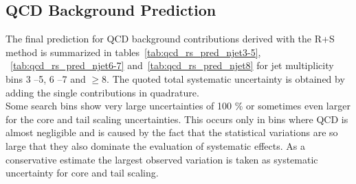 \subsection{QCD Background Prediction}
\label{subsec:RA2_qcd_pred}
The final prediction for QCD background contributions derived with the R+S method is summarized in tables~\ref{tab:qcd_rs_pred_njet3-5}, ~\ref{tab:qcd_rs_pred_njet6-7} and~\ref{tab:qcd_rs_pred_njet8} for jet multiplicity bins 3 --5, 6 --7 and $\ge 8$. The quoted total systematic uncertainty is obtained by adding the single contributions in quadrature. \\
Some search bins show very large uncertainties of 100 $\%$ or sometimes even larger for the core and tail scaling uncertainties. This occurs only in bins where QCD is almost negligible and is caused by the fact that the statistical variations are so large that they also dominate the evaluation of systematic effects. As a conservative estimate the largest observed variation is taken as systematic uncertainty for core and tail scaling. 

